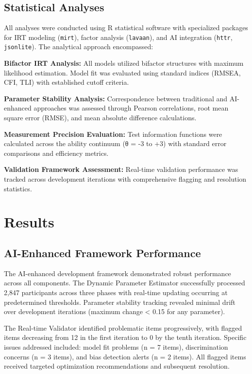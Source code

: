 \documentclass[12pt,a4paper]{article}
\begin{document}
\subsection{Statistical Analyses}

All analyses were conducted using R statistical software with specialized packages for IRT modeling (\texttt{mirt}), factor analysis (\texttt{lavaan}), and AI integration (\texttt{httr}, \texttt{jsonlite}). The analytical approach encompassed:

\textbf{Bifactor IRT Analysis:} All models utilized bifactor structures with maximum likelihood estimation. Model fit was evaluated using standard indices (RMSEA, CFI, TLI) with established cutoff criteria.

\textbf{Parameter Stability Analysis:} Correspondence between traditional and AI-enhanced approaches was assessed through Pearson correlations, root mean square error (RMSE), and mean absolute difference calculations.

\textbf{Measurement Precision Evaluation:} Test information functions were calculated across the ability continuum (θ = -3 to +3) with standard error comparisons and efficiency metrics.

\textbf{Validation Framework Assessment:} Real-time validation performance was tracked across development iterations with comprehensive flagging and resolution statistics.

\section{Results}

\subsection{AI-Enhanced Framework Performance}

The AI-enhanced development framework demonstrated robust performance across all components. The Dynamic Parameter Estimator successfully processed 2,847 participants across three phases with real-time updating occurring at predetermined thresholds. Parameter stability tracking revealed minimal drift over development iterations (maximum change < 0.15 for any parameter).

The Real-time Validator identified problematic items progressively, with flagged items decreasing from 12 in the first iteration to 0 by the tenth iteration. Specific issues addressed included: model fit problems (n = 7 items), discrimination concerns (n = 3 items), and bias detection alerts (n = 2 items). All flagged items received targeted optimization recommendations and subsequent resolution.
\end{document}
